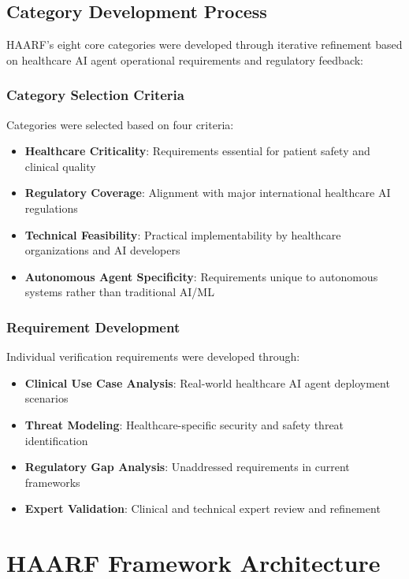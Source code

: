 \documentclass[11pt]{article}
\begin{document}
\subsection{Category Development Process}

HAARF's eight core categories were developed through iterative refinement based on healthcare AI agent operational requirements and regulatory feedback:

\subsubsection{Category Selection Criteria}

Categories were selected based on four criteria:
\begin{itemize}
    \item \textbf{Healthcare Criticality}: Requirements essential for patient safety and clinical quality
    \item \textbf{Regulatory Coverage}: Alignment with major international healthcare AI regulations
    \item \textbf{Technical Feasibility}: Practical implementability by healthcare organizations and AI developers
    \item \textbf{Autonomous Agent Specificity}: Requirements unique to autonomous systems rather than traditional AI/ML
\end{itemize}

\subsubsection{Requirement Development}

Individual verification requirements were developed through:
\begin{itemize}
    \item \textbf{Clinical Use Case Analysis}: Real-world healthcare AI agent deployment scenarios
    \item \textbf{Threat Modeling}: Healthcare-specific security and safety threat identification
    \item \textbf{Regulatory Gap Analysis}: Unaddressed requirements in current frameworks
    \item \textbf{Expert Validation}: Clinical and technical expert review and refinement
\end{itemize}

\section{HAARF Framework Architecture}
\end{document}
